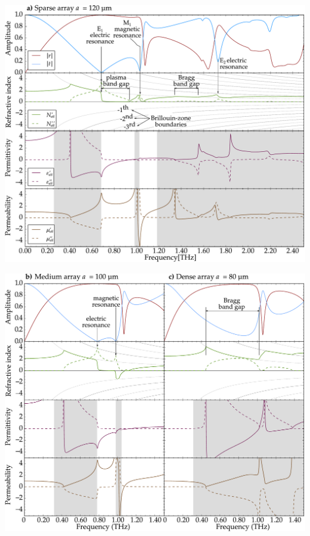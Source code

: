 \documentclass[t]{beamer} \usepackage[english]{babel} \usepackage[utf8]{inputenc} \usetheme{Frankfurt} %
\begin{document}
\begin{frame}[plain]{}	%
\hspace{6mm} \includegraphics[height=.97\paperheight]{../img/ERods_eps100_single_a120_FDTD.pdf}
\end{frame} 		%

\begin{frame}[plain]{}	%
\hspace{6mm} \includegraphics[width=1.12\paperheight]{../img/ERods_eps100_double_a100a080_FDTD.pdf}
\end{frame} 		%
\end{document}
